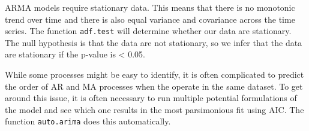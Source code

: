 \documentclass[
]{article}
\begin{document}
ARMA models require stationary data. This means that there is no
monotonic trend over time and there is also equal variance and
covariance across the time series. The function \texttt{adf.test} will
determine whether our data are stationary. The null hypothesis is that
the data are not stationary, so we infer that the data are stationary if
the p-value is \textless{} 0.05.

While some processes might be easy to identify, it is often complicated
to predict the order of AR and MA processes when the operate in the same
dataset. To get around this issue, it is often necessary to run multiple
potential formulations of the model and see which one results in the
most parsimonious fit using AIC. The function \texttt{auto.arima} does
this automatically.
\end{document}

